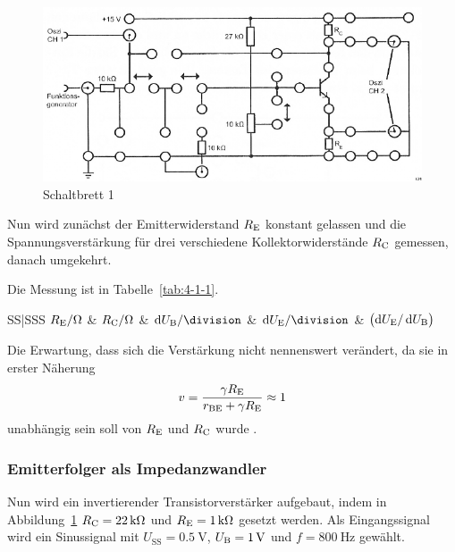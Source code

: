\begin{figure}
	\centering
	\includegraphics[width=\textwidth]{Anleitung/3-4.png}
	\caption{%
		Schaltbrett 1
	}
	\label{fig:3-4}
\end{figure}

Nun wird zunächst der Emitterwiderstand $\RE$ konstant gelassen und die
Spannungsverstärkung für drei verschiedene Kollektorwiderstände $\RC$ gemessen,
danach umgekehrt.

Die Messung ist in Tabelle~\ref{tab:4-1-1}.

\begin{table}
	\centering
	\begin{tabular}{SS|SSS}
		{$\RE / \si{\ohm}$} & {$\RC / \si{\ohm}$} & {$\dif\UB / \si{\division}$}
		& {$\dif\UE / \si{\division}$} & {$\del{\dif\UE / \dif\UB}$} \\
		\hline
	\end{tabular}
	\caption{%
		Abhängigkeit der Spannungsverstärkung von $\RE$ und $\RC$
	}
\label{tab:4-1-1}
\end{table}

Die Erwartung, dass sich die Verstärkung nicht nennenswert verändert, da sie in
erster Näherung
\[v = \frac{\gamma\RE}{r_\text{BE}+\gamma\RE} \approx 1\]
unabhängig sein soll von $\RE$ und $\RC$ wurde \messwert.


\subsubsection{Emitterfolger als Impedanzwandler}

Nun wird ein invertierender Transistorverstärker aufgebaut, indem in
Abbildung~\ref{fig:3-4} $\RC = \SI {22}{\kilo\ohm}$ und $\RE = \SI
1{\kilo\ohm}$ gesetzt werden. Als Eingangssignal wird ein Sinussignal mit
$U_\text{SS} = \SI {0.5}{\volt}$, $\UB = \SI 1{\volt}$ und $f =
\SI{800}{\hertz}$ gewählt.

